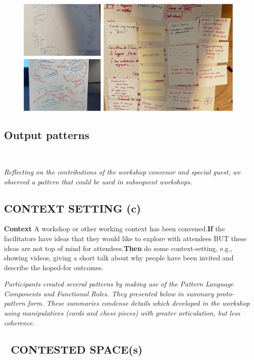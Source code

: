 \documentclass[acmlarge,timestamp]{acmart}
\newcommand{\sensory}{(s)}
\newcommand{\cognitive}{(c)}
\begin{document}
\begin{figure}
  \includegraphics[width=\textwidth]{PatternProcess.png}
  \caption{\label{ExampleParticipantPattern}}
\end{figure}

\clearpage 

\subsection{Output patterns} ~
\smallskip

\noindent \emph{Reflecting on the contributions of the workshop
convenor and special guest, we observed a pattern that could be used
in subsequent workshops.}

\subsection*{CONTEXT SETTING {\hfill \cognitive}}
\textbf{Context} A workshop or other working context has been
convened.\newline \textbf{If} the facilitators have ideas that they
would like to explore with attendees BUT these ideas are not top of
mind for attendees.\newline \textbf{Then} do some context-setting,
e.g., showing videos, giving a short talk about why people have been
invited and describe the hoped-for outcomes.

\smallskip

\noindent \emph{Participants created several patterns by making use of
the {\sc Pattern Language Components} and {\sc Functional Roles}.
They presented below in summary proto-pattern form.  These summaries
condense details which developed in the workshop using manipulatives
(cards and chess pieces) with greater articulation, but less
coherence.}

\subsection*{💎 CONTESTED SPACE{\hfill \sensory}}\label{pat:contested-space}
\end{document}
